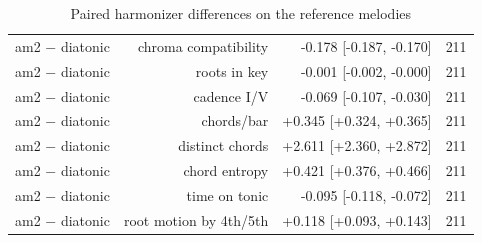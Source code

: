 \begin{table}[t]
\begin{tabular}{lrrr}
am2 $-$ diatonic & chroma compatibility & -0.178 [-0.187, -0.170] & 211 \\
am2 $-$ diatonic & roots in key & -0.001 [-0.002, -0.000] & 211 \\
am2 $-$ diatonic & cadence I/V & -0.069 [-0.107, -0.030] & 211 \\
am2 $-$ diatonic & chords/bar & +0.345 [+0.324, +0.365] & 211 \\
am2 $-$ diatonic & distinct chords & +2.611 [+2.360, +2.872] & 211 \\
am2 $-$ diatonic & chord entropy & +0.421 [+0.376, +0.466] & 211 \\
am2 $-$ diatonic & time on tonic & -0.095 [-0.118, -0.072] & 211 \\
am2 $-$ diatonic & root motion by 4th/5th & +0.118 [+0.093, +0.143] & 211 \\
\bottomrule
\end{tabular}
\caption{Paired harmonizer differences on the reference melodies}
\label{tab:melody_to_chord_paired}
\end{table}
